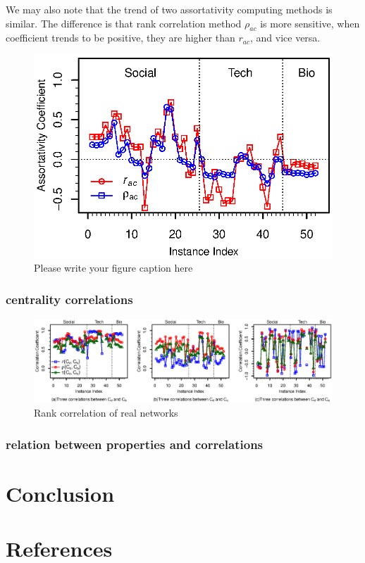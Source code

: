 \documentclass[symmetry,article,submit,moreauthors,pdftex,10pt,a4paper]{Definitions/mdpi}
\begin{document}
We may also note that the trend of two assortativity computing methods is similar. The difference is that rank correlation method $\rho_{ac}$ is more sensitive, when coefficient trends to be positive, they are higher than $r_{ac}$, and vice versa. 
%
\begin{figure}
    \centering
    \includegraphics[width=0.6\columnwidth]{figs/rn-ac}
    \caption{Please write your figure caption here}
    \label{fig:rn-ac}       %
\end{figure}
\subsubsection{centrality correlations}


\begin{figure}
    \centering
    \includegraphics[width=0.96\columnwidth]{figs/rn-correlations}
    \caption{Rank correlation of real networks}
    \label{fig:rn-correlations}       %
\end{figure}

\subsubsection{relation between properties and correlations}

\section{Conclusion}

\section{References}

\end{document}
